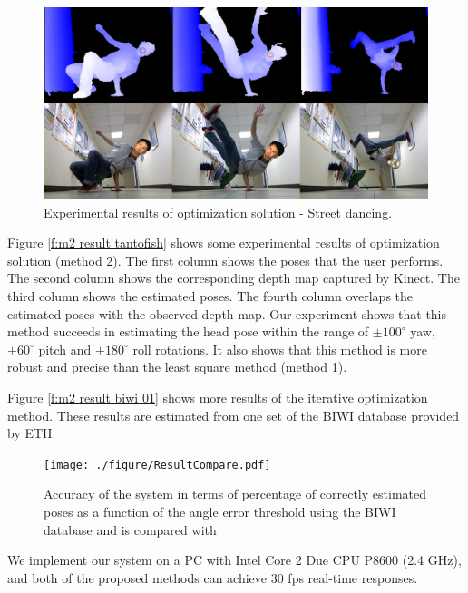 \begin{figure}
\includegraphics[width=1.0\linewidth]{./figure/StreetDance.png}
\caption{Experimental results of optimization solution - Street dancing.}
\label{f:m2 result tantofish 4}       %
\end{figure}


Figure \ref{f:m2 result tantofish} shows some experimental results of optimization solution (method 2). The first column shows the poses that the user performs. The second column shows the corresponding depth map captured by Kinect. The third column shows the estimated poses. The fourth column overlaps the estimated poses with the observed depth map. Our experiment shows that this method succeeds in estimating the head pose within the range of $\pm 100^{\circ}$ yaw, $\pm 60^{\circ}$ pitch and $\pm 180^{\circ}$ roll rotations. It also shows that this method is more robust and precise than the least square method (method 1). 

Figure \ref{f:m2 result biwi 01} shows more results of the iterative optimization method. These results are estimated from one set of the BIWI database provided by ETH. 

\begin{figure}
\centering
\texttt{[image: ./figure/ResultCompare.pdf]}
\caption{Accuracy of the system in terms of percentage of correctly estimated poses as a function of the angle error threshold using the BIWI database and is compared with \cite{fanelli_DAGM11}}
\label{f:m2 result tantofish 5}       %
\end{figure}


We implement our system on a PC with Intel Core 2 Due CPU P8600 (2.4 GHz), and both of the proposed methods can achieve 30 fps real-time responses.